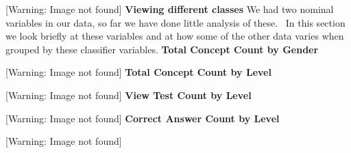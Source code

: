 \documentclass[12pt,twoside]{article}
\begin{document}
 [Warning: Image not found] \newline
\newline
\textbf{Viewing different classes}\newline
We had two nominal variables in our data, so far we have done little
analysis of these.~ In this section we look briefly at these variables
and at how some of the other data varies when grouped by these
classifier variables.\newline
\newline
\newline
\textbf{Total Concept Count by Gender}

 [Warning: Image not found]  
\newline
\newline
\textbf{Total Concept Count by Level} 

 [Warning: Image not found]  
\newline
\textbf{View Test Count by Level} 

 [Warning: Image not found]  
\newline
\textbf{Correct Answer Count by Level} 

 [Warning: Image not found]  
\newline
\newline
\newline
\end{document}
